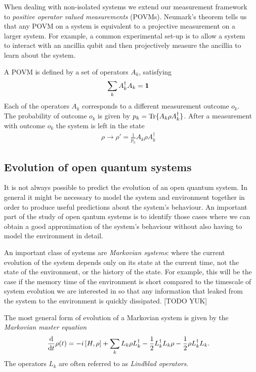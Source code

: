 When dealing with non-isolated systems we extend our measurement framework to \textit{positive operator valued measurements} (POVMs). Neumark's theorem \cite{?} tells us that any POVM on a system is equivalent to a projective measurement on a larger system. For example, a common experimental set-up is to allow a system to interact with an ancillia qubit and then projectively measure the ancillia to learn about the system.

A POVM  is defined by a set of operators $A_k$, satisfying
\begin{align}
  \label{POVM_completeness_eq}
  \sum_k A_k^\dagger A_k = \mathbf{1}
\end{align}
Each of the operators $A_k$ corresponds to a different measurement outcome $o_k$. The probability of outcome $o_k$ is given by $p_k = \operatorname{Tr}\{A_k \rho A_k^\dagger\}$. After a measurement with outcome $o_k$ the system is left in the state
\begin{align}\label{POVM_normalisation_eq}
  \rho \rightarrow \rho' = \frac{1}{p_k} A_k \rho A_k^\dagger
\end{align}

\subsection{Evolution of open quantum systems}

It is not always possible to predict the evolution of an open quantum system. In general it might be necessary to model the system and environment together in order to produce useful predictions about the system's behaviour. An important part of the study of open qantum systems is to identify those cases where we can obtain a good approximation of the system's behaviour without also having to model the environment in detail.

An important class of systems are \textit{Markovian systems}: where the current evolution of the system depends only on its state at the current time, not the state of the environment, or the history of the state. For example, this will be the case if the memory time of the environment is short compared to the timescale of system evolution we are interested in so that any information that leaked from the system to the environment is quickly dissipated. [TODO YUK]

The most general form \cite{lindblad} of evolution of a Markovian system is given by the \textit{Markovian master equation}
\begin{align}\label{master_eq}
  \frac{\mathrm{d}}{\mathrm{d}t} \rho(t) = -i \left[H, \rho\right] + \sum_k L_k \rho L_k^\dagger -\frac{1}{2} L_k^\dagger L_k \rho -\frac{1}{2} \rho L_k^\dagger L_k .
\end{align}
The operators $L_k$ are often referred to as \textit{Lindblad operators}. 

